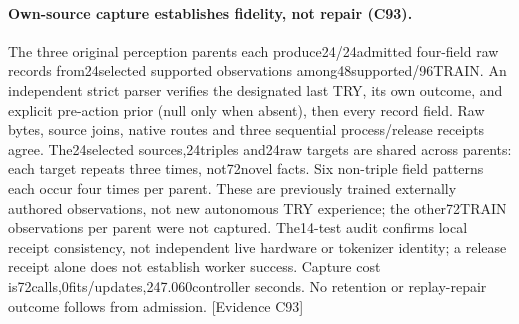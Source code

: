 \documentclass[11pt]{article}
\newcommand{\ev}[1]{\textsf{[Evidence #1]}}
\begin{document}
\paragraph{Own-source capture establishes fidelity, not repair (C93).}
The three original perception parents each produce24/24admitted four-field raw
records from24selected supported observations among48supported/96TRAIN.
An independent strict parser verifies the designated last TRY, its own outcome,
and explicit pre-action prior (null only when absent), then every record field.
Raw bytes, source joins, native routes and three sequential process/release
receipts agree. The24selected sources,24triples and24raw targets are shared
across parents: each target repeats three times, not72novel facts. Six
non-triple field patterns each occur four times per parent. These are previously
trained externally authored observations, not new autonomous TRY experience;
the other72TRAIN observations per parent were not captured. The14-test audit
confirms local receipt consistency, not independent live hardware or tokenizer
identity; a release receipt alone does not establish worker success.
Capture cost is72calls,0fits/updates,247.060controller seconds. No retention
or replay-repair outcome follows from admission. \ev{C93}
\end{document}
